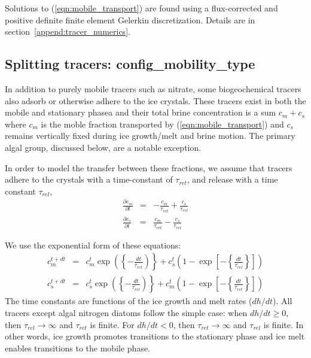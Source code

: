 Solutions to (\ref{eqn:mobile_transport}) are found using a flux-corrected and
positive definite finite element
Gelerkin discretization.  Details are in section~\ref{append:tracer_numerics}.

\subsection{Splitting tracers:  config\_mobility\_type}
In addition to purely mobile tracers such as nitrate, some biogeochemical tracers also adsorb or
otherwise adhere to the ice crystals.  These tracers exist in both the
mobile and stationary phasea and their
total brine concentration is a sum $c_m + c_s$
where $c_m$ is the moble fraction transported by
(\ref{eqn:mobile_transport}) and $c_s$  remains vertically fixed during ice growth/melt and brine motion.  The primary algal group, discussed below,  are a notable exception.

In order to model the transfer between these fractions, we assume that tracers adhere to the crystals with a time-constant of
$\tau_{ret}$, and release with a time constant $\tau_{rel}$, \bgcie
\begin{eqnarray}
\frac{\partial c_m}{\partial t} & = & -\frac{c_m}{\tau_{ret}} + \frac{c_s}{\tau_{rel}} \\
\nonumber
\frac{\partial c_s}{\partial t} & = &\frac{c_m}{\tau_{ret}} - \frac{c_s}{\tau_{rel}}
\end{eqnarray}

We use the exponential form of these equations:
\begin{eqnarray}
c_m^{t+dt} & = &
c_m^t\exp\left(\left\{-\frac{dt}{\tau_{ret}}\right)\right\} +
c^t_s\left(1- \exp\left[-\left\{\frac{dt}{\tau_{rel}}\right\}\right]\right)  \nonumber
\end{eqnarray}
\begin{eqnarray}
c_s^{t+dt} & = & c_s^t\exp\left(\left\{-\frac{dt}{\tau_{rel}}\right)\right\} +
c_m^t\left(1-\exp\left[-\left\{\frac{dt}{\tau_{ret}}\right\}\right]\right) \nonumber
\end{eqnarray}
The time constants are functions of the ice growth and melt rates
($dh/dt$). All tracers except algal nitrogen diatoms follow the
simple case: when $dh/dt \geq 0$, then $\tau_{rel} \rightarrow \infty$ and
$\tau_{ret}$ is finite.  For $dh/dt < 0$, then $\tau_{ret} \rightarrow \infty$ and
$\tau_{rel}$ is finite.  In other words,  ice growth promotes transitions to the
stationary phase and ice melt enables transitions to the mobile phase.

